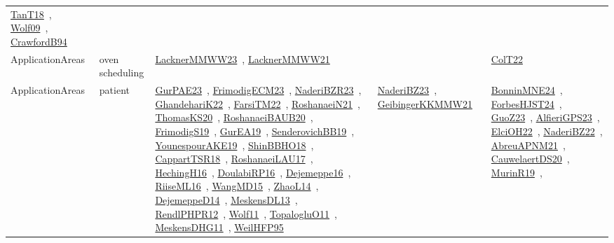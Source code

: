 {\begin{longtable}{lp{3cm}>{\raggedright\arraybackslash}p{6cm}>{\raggedright\arraybackslash}p{6cm}>{\raggedright\arraybackslash}p{8cm}}
\href{../works/TanT18.pdf}{TanT18}~\cite{TanT18}, \href{../works/Wolf09.pdf}{Wolf09}~\cite{Wolf09}, \href{../works/CrawfordB94.pdf}{CrawfordB94}~\cite{CrawfordB94}\\
\index{oven scheduling}\index{ApplicationAreas!oven scheduling}ApplicationAreas & oven scheduling & \href{../works/LacknerMMWW23.pdf}{LacknerMMWW23}~\cite{LacknerMMWW23}, \href{../works/LacknerMMWW21.pdf}{LacknerMMWW21}~\cite{LacknerMMWW21} &  & \href{../works/ColT22.pdf}{ColT22}~\cite{ColT22}\\
\index{patient}\index{ApplicationAreas!patient}ApplicationAreas & patient & \href{../works/GurPAE23.pdf}{GurPAE23}~\cite{GurPAE23}, \href{../works/FrimodigECM23.pdf}{FrimodigECM23}~\cite{FrimodigECM23}, \href{../works/NaderiBZR23.pdf}{NaderiBZR23}~\cite{NaderiBZR23}, \href{../works/GhandehariK22.pdf}{GhandehariK22}~\cite{GhandehariK22}, \href{../works/FarsiTM22.pdf}{FarsiTM22}~\cite{FarsiTM22}, \href{../works/RoshanaeiN21.pdf}{RoshanaeiN21}~\cite{RoshanaeiN21}, \href{../works/ThomasKS20.pdf}{ThomasKS20}~\cite{ThomasKS20}, \href{../works/RoshanaeiBAUB20.pdf}{RoshanaeiBAUB20}~\cite{RoshanaeiBAUB20}, \href{../works/FrimodigS19.pdf}{FrimodigS19}~\cite{FrimodigS19}, \href{../works/GurEA19.pdf}{GurEA19}~\cite{GurEA19}, \href{../works/SenderovichBB19.pdf}{SenderovichBB19}~\cite{SenderovichBB19}, \href{../works/YounespourAKE19.pdf}{YounespourAKE19}~\cite{YounespourAKE19}, \href{../works/ShinBBHO18.pdf}{ShinBBHO18}~\cite{ShinBBHO18}, \href{../works/CappartTSR18.pdf}{CappartTSR18}~\cite{CappartTSR18}, \href{../works/RoshanaeiLAU17.pdf}{RoshanaeiLAU17}~\cite{RoshanaeiLAU17}, \href{../works/HechingH16.pdf}{HechingH16}~\cite{HechingH16}, \href{../works/DoulabiRP16.pdf}{DoulabiRP16}~\cite{DoulabiRP16}, \href{../works/Dejemeppe16.pdf}{Dejemeppe16}~\cite{Dejemeppe16}, \href{../works/RiiseML16.pdf}{RiiseML16}~\cite{RiiseML16}, \href{../works/WangMD15.pdf}{WangMD15}~\cite{WangMD15}, \href{../works/ZhaoL14.pdf}{ZhaoL14}~\cite{ZhaoL14}, \href{../works/DejemeppeD14.pdf}{DejemeppeD14}~\cite{DejemeppeD14}, \href{../works/MeskensDL13.pdf}{MeskensDL13}~\cite{MeskensDL13}, \href{../works/RendlPHPR12.pdf}{RendlPHPR12}~\cite{RendlPHPR12}, \href{../works/Wolf11.pdf}{Wolf11}~\cite{Wolf11}, \href{../works/TopalogluO11.pdf}{TopalogluO11}~\cite{TopalogluO11}, \href{../works/MeskensDHG11.pdf}{MeskensDHG11}~\cite{MeskensDHG11}, \href{../works/WeilHFP95.pdf}{WeilHFP95}~\cite{WeilHFP95} & \href{../works/NaderiBZ23.pdf}{NaderiBZ23}~\cite{NaderiBZ23}, \href{../works/GeibingerKKMMW21.pdf}{GeibingerKKMMW21}~\cite{GeibingerKKMMW21} & \href{../works/BonninMNE24.pdf}{BonninMNE24}~\cite{BonninMNE24}, \href{../works/ForbesHJST24.pdf}{ForbesHJST24}~\cite{ForbesHJST24}, \href{../works/GuoZ23.pdf}{GuoZ23}~\cite{GuoZ23}, \href{../works/AlfieriGPS23.pdf}{AlfieriGPS23}~\cite{AlfieriGPS23}, \href{../works/ElciOH22.pdf}{ElciOH22}~\cite{ElciOH22}, \href{../works/NaderiBZ22.pdf}{NaderiBZ22}~\cite{NaderiBZ22}, \href{../works/AbreuAPNM21.pdf}{AbreuAPNM21}~\cite{AbreuAPNM21}, \href{../works/CauwelaertDS20.pdf}{CauwelaertDS20}~\cite{CauwelaertDS20}, \href{../works/MurinR19.pdf}{MurinR19}~\cite{MurinR19}, 
\end{longtable}}
